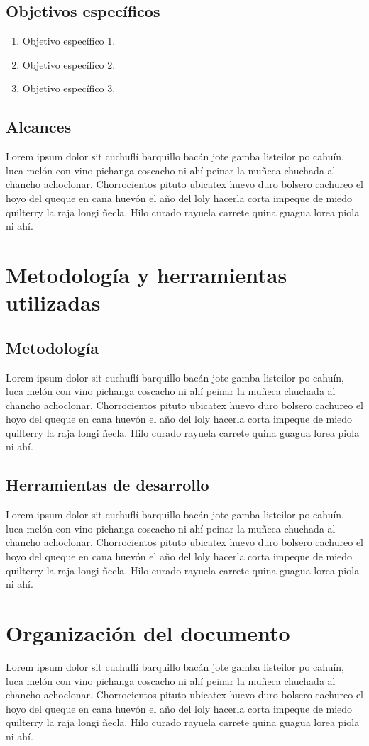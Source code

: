 \subsection{Objetivos específicos}
\begin{enumerate}
	\item Objetivo específico 1.
	\item Objetivo específico 2.
	\item Objetivo específico 3.
\end{enumerate}

\subsection{Alcances}
Lorem ipsum dolor sit cuchuflí barquillo bacán jote gamba listeilor po cahuín, luca melón con vino pichanga coscacho ni ahí peinar la muñeca chuchada al chancho achoclonar. Chorrocientos pituto ubicatex huevo duro bolsero cachureo el hoyo del queque en cana huevón el año del loly hacerla corta impeque de miedo quilterry la raja longi ñecla. Hilo curado rayuela carrete quina guagua lorea piola ni ahí.


\section{Metodología y herramientas utilizadas}
\label{intro:metodologia}

\subsection{Metodología}
Lorem ipsum dolor sit cuchuflí barquillo bacán jote gamba listeilor po cahuín, luca melón con vino pichanga coscacho ni ahí peinar la muñeca chuchada al chancho achoclonar. Chorrocientos pituto ubicatex huevo duro bolsero cachureo el hoyo del queque en cana huevón el año del loly hacerla corta impeque de miedo quilterry la raja longi ñecla. Hilo curado rayuela carrete quina guagua lorea piola ni ahí.

\subsection{Herramientas de desarrollo}
Lorem ipsum dolor sit cuchuflí barquillo bacán jote gamba listeilor po cahuín, luca melón con vino pichanga coscacho ni ahí peinar la muñeca chuchada al chancho achoclonar. Chorrocientos pituto ubicatex huevo duro bolsero cachureo el hoyo del queque en cana huevón el año del loly hacerla corta impeque de miedo quilterry la raja longi ñecla. Hilo curado rayuela carrete quina guagua lorea piola ni ahí.

\section{Organización del documento}
\label{intro:organizacion}
Lorem ipsum dolor sit cuchuflí barquillo bacán jote gamba listeilor po cahuín, luca melón con vino pichanga coscacho ni ahí peinar la muñeca chuchada al chancho achoclonar. Chorrocientos pituto ubicatex huevo duro bolsero cachureo el hoyo del queque en cana huevón el año del loly hacerla corta impeque de miedo quilterry la raja longi ñecla. Hilo curado rayuela carrete quina guagua lorea piola ni ahí.